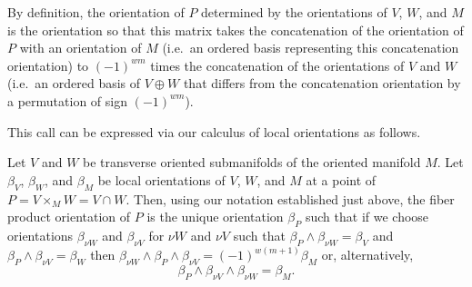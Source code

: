 By definition, the orientation of $P$ determined by the orientations of $V$, $W$, and $M$ is the orientation so that this matrix takes the concatenation of the orientation of $P$ with an orientation of $M$ (i.e.\ an ordered basis representing this concatenation orientation) to $(-1)^{wm}$ times the concatenation of the orientations of $V$ and $W$ (i.e.\ an ordered basis of $V \oplus W$ that differs from the concatenation orientation by a permutation of sign $(-1)^{wm}$).

This call can be expressed via our calculus of local orientations as follows.

\begin{proposition}\label{P: orient intersection}
	Let $V$ and $W$ be transverse oriented submanifolds of the oriented manifold $M$.
	Let $\beta_V$, $\beta_W$, and $\beta_M$ be local orientations of $V$, $W$, and $M$ at a point of $P = V \times_M W = V \cap W$.
	Then, using our notation established just above, the fiber product orientation of $P$ is the unique orientation $\beta_P$ such that if we choose orientations $\beta_{\nu W}$ and $\beta_{\nu V}$ for $\nu W$ and $\nu V$ such that $\beta_P \wedge \beta_{\nu W} = \beta_V$ and $\beta_P \wedge \beta_{\nu V} = \beta_W$ then $\beta_{\nu W} \wedge \beta_P \wedge \beta_{\nu V} = (-1)^{w(m+1)}\beta_M$ or, alternatively, $$\beta_P \wedge \beta_{\nu V} \wedge \beta_{\nu W} = \beta_M.$$
\end{proposition}

